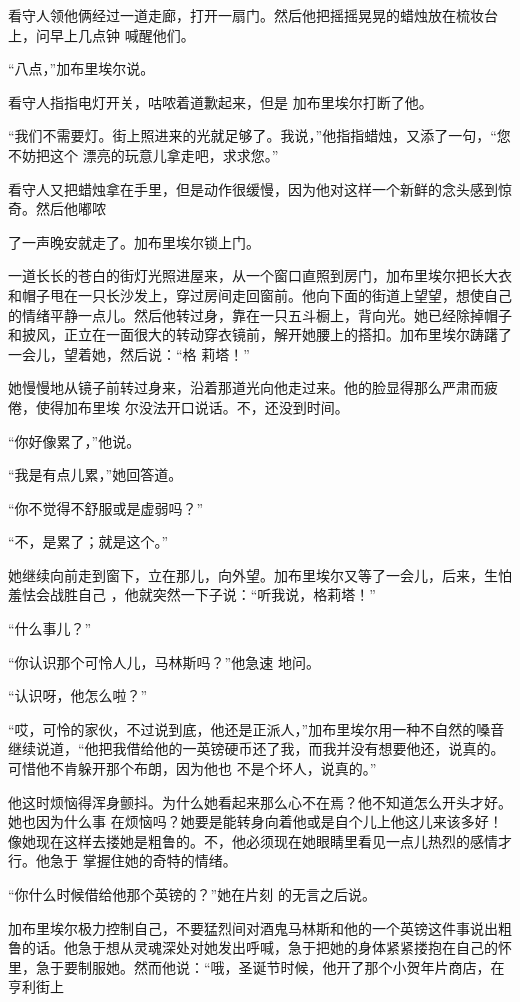 \documentclass{article}
\begin{document}
看守人领他俩经过一道走廊，打开一扇门。然后他把摇摇晃晃的蜡烛放在梳妆台上，问早上几点钟
喊醒他们。 


“八点，”加布里埃尔说。 

看守人指指电灯开关，咕哝着道歉起来，但是
加布里埃尔打断了他。 

“我们不需要灯。街上照进来的光就足够了。我说，”他指指蜡烛，又添了一句，“您不妨把这个
漂亮的玩意儿拿走吧，求求您。” 

看守人又把蜡烛拿在手里，但是动作很缓慢，因为他对这样一个新鲜的念头感到惊奇。然后他嘟哝
\newpage

了一声晚安就走了。加布里埃尔锁上门。 

一道长长的苍白的街灯光照进屋来，从一个窗口直照到房门，加布里埃尔把长大衣和帽子甩在一只长沙发上，穿过房间走回窗前。他向下面的街道上望望，想使自己的情绪平静一点儿。然后他转过身，靠在一只五斗橱上，背向光。她已经除掉帽子和披风，正立在一面很大的转动穿衣镜前，解开她腰上的搭扣。加布里埃尔踌躇了一会儿，望着她，然后说：“格
莉塔！” 

她慢慢地从镜子前转过身来，沿着那道光向他走过来。他的脸显得那么严肃而疲倦，使得加布里埃
尔没法开口说话。不，还没到时间。 


“你好像累了，”他说。 


“我是有点儿累，”她回答道。 


“你不觉得不舒服或是虚弱吗？” 

\newpage


“不，是累了；就是这个。” 

她继续向前走到窗下，立在那儿，向外望。加布里埃尔又等了一会儿，后来，生怕羞怯会战胜自己
，他就突然一下子说：“听我说，格莉塔！” 


“什么事儿？” 

“你认识那个可怜人儿，马林斯吗？”他急速
地问。 


“认识呀，他怎么啦？” 

“哎，可怜的家伙，不过说到底，他还是正派人，”加布里埃尔用一种不自然的嗓音继续说道，“他把我借给他的一英镑硬币还了我，而我并没有想要他还，说真的。可惜他不肯躲开那个布朗，因为他也
不是个坏人，说真的。” 

他这时烦恼得浑身颤抖。为什么她看起来那么心不在焉？他不知道怎么开头才好。她也因为什么事
\newpage
在烦恼吗？她要是能转身向着他或是自个儿上他这儿来该多好！像她现在这样去搂她是粗鲁的。不，他必须现在她眼睛里看见一点儿热烈的感情才行。他急于
掌握住她的奇特的情绪。 

“你什么时候借给他那个英镑的？”她在片刻
的无言之后说。 

加布里埃尔极力控制自己，不要猛烈间对酒鬼马林斯和他的一个英镑这件事说出粗鲁的话。他急于想从灵魂深处对她发出呼喊，急于把她的身体紧紧搂抱在自己的怀里，急于要制服她。然而他说：“哦，圣诞节时候，他开了那个小贺年片商店，在亨利街上
\end{document}
